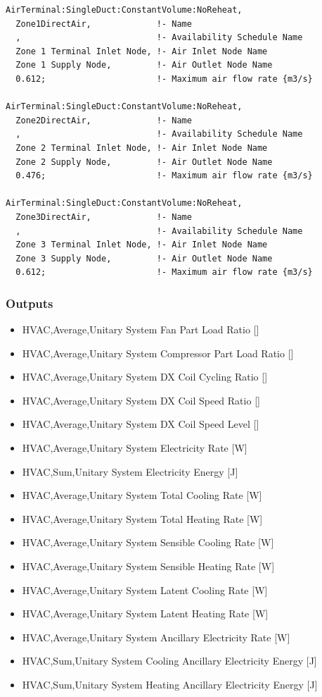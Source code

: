 \begin{lstlisting}
AirTerminal:SingleDuct:ConstantVolume:NoReheat,
  Zone1DirectAir,             !- Name
  ,                           !- Availability Schedule Name
  Zone 1 Terminal Inlet Node, !- Air Inlet Node Name
  Zone 1 Supply Node,         !- Air Outlet Node Name
  0.612;                      !- Maximum air flow rate {m3/s}

AirTerminal:SingleDuct:ConstantVolume:NoReheat,
  Zone2DirectAir,             !- Name
  ,                           !- Availability Schedule Name
  Zone 2 Terminal Inlet Node, !- Air Inlet Node Name
  Zone 2 Supply Node,         !- Air Outlet Node Name
  0.476;                      !- Maximum air flow rate {m3/s}

AirTerminal:SingleDuct:ConstantVolume:NoReheat,
  Zone3DirectAir,             !- Name
  ,                           !- Availability Schedule Name
  Zone 3 Terminal Inlet Node, !- Air Inlet Node Name
  Zone 3 Supply Node,         !- Air Outlet Node Name
  0.612;                      !- Maximum air flow rate {m3/s}
\end{lstlisting}

\subsubsection{Outputs}\label{outputs-3-021}

\begin{itemize}
\item
  HVAC,Average,Unitary System Fan Part Load Ratio {[]}
\item
  HVAC,Average,Unitary System Compressor Part Load Ratio {[]}
\item
  HVAC,Average,Unitary System DX Coil Cycling Ratio {[]}
\item
  HVAC,Average,Unitary System DX Coil Speed Ratio {[]}
\item
  HVAC,Average,Unitary System DX Coil Speed Level {[]}
\item
  HVAC,Average,Unitary System Electricity Rate {[}W{]}
\item
  HVAC,Sum,Unitary System Electricity Energy {[}J{]}
\item
  HVAC,Average,Unitary System Total Cooling Rate {[}W{]}
\item
  HVAC,Average,Unitary System Total Heating Rate {[}W{]}
\item
  HVAC,Average,Unitary System Sensible Cooling Rate {[}W{]}
\item
  HVAC,Average,Unitary System Sensible Heating Rate {[}W{]}
\item
  HVAC,Average,Unitary System Latent Cooling Rate {[}W{]}
\item
  HVAC,Average,Unitary System Latent Heating Rate {[}W{]}
\item
  HVAC,Average,Unitary System Ancillary Electricity Rate {[}W{]}
\item
  HVAC,Sum,Unitary System Cooling Ancillary Electricity Energy {[}J{]}
\item
  HVAC,Sum,Unitary System Heating Ancillary Electricity Energy {[}J{]}
\end{itemize}

